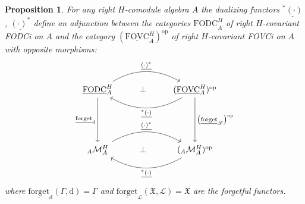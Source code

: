 \documentclass{article}
\newtheorem{proposition}[thm]{Proposition}
\theoremstyle{definition}
\begin{document}
	\begin{proposition}\label{prop:duality'}
		For any right $H$-comodule algebra $A$ the dualizing functors $\underline{{}^*(\cdot)}$, $\underline{(\cdot)^*}$
		define an adjunction between the categories $\underline{\mathrm{FODC}}_A^H$ of right $H$-covariant FODCi on $A$ and the category $(\underline{\mathrm{FOVC}}_A^H)^\mathrm{op}$ of right $H$-covariant {FOVCi} on $A$ with opposite morphisms:
		\begin{equation*}
			\begin{tikzcd}
				\underline{\mathrm{FODC}}_A^H \arrow[rr, bend left, "\underline{(\cdot)^*}"] \arrow{ddd}[swap]{\underline{\mathrm{forget}}_\mathrm{d}} & \perp & (\underline{\mathrm{FOVC}}_A^H)^\mathrm{op} \arrow[ll, bend left, "\underline{{}^*(\cdot)}"] \arrow{ddd}{\big(\underline{\mathrm{forget}}_\mathscr{L}\big)^\mathrm{op}}\\
				& & \\
				& & \\
				{}_A\mathcal{M}_A^H \arrow[rr, bend left, "\underline{(\cdot)^*}"] & \perp & ({}_A\mathcal{M}_A^H)^\mathrm{op} \arrow[ll, bend left, "\underline{{}^*(\cdot)}"]
			\end{tikzcd}
		\end{equation*}
		where
		$\underline{\mathrm{forget}}_\mathrm{d}(\Gamma,\mathrm{d})=\Gamma$ and $\underline{\mathrm{forget}}_\mathscr{L}(\mathfrak{X},\mathscr{L})=\mathfrak{X}$
		are the forgetful functors.
	\end{proposition}
\end{document}
